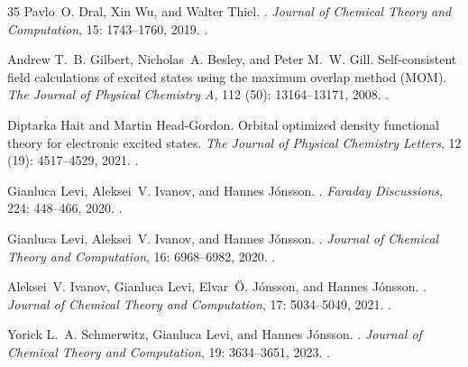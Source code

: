 \documentclass[11pt,a4paper]{article}
\begin{document}
\begin{thebibliography}{35}
Pavlo~O. Dral, Xin Wu, and Walter Thiel.
.
\newblock \emph{Journal of Chemical Theory and Computation}, 15:
  1743--1760, 2019.
\newblock {}.

Andrew T.~B. Gilbert, Nicholas~A. Besley, and Peter M.~W. Gill.
\newblock Self-consistent field calculations of excited states using the
  maximum overlap method ({MOM}).
\newblock \emph{The Journal of Physical Chemistry A}, 112
  (50): 13164--13171, 2008.
\newblock {}.

Diptarka Hait and Martin Head-Gordon.
\newblock Orbital optimized density functional theory for electronic excited
  states.
\newblock \emph{The Journal of Physical Chemistry Letters}, 12
  (19): 4517--4529, 2021.
\newblock {}.

Gianluca Levi, Aleksei~V. Ivanov, and Hannes J{\'o}nsson.
.
\newblock \emph{Faraday Discussions}, 224: 448--466,
  2020{}.
\newblock {}.

Gianluca Levi, Aleksei~V. Ivanov, and Hannes J{\'o}nsson.
.
\newblock \emph{Journal of Chemical Theory and Computation}, 16:
  6968--6982, 2020{}.
\newblock {}.

Aleksei~V. Ivanov, Gianluca Levi, Elvar~{\"O}. J{\'o}nsson, and Hannes
  J{\'o}nsson.
.
\newblock \emph{Journal of Chemical Theory and Computation}, 17:
  5034--5049, 2021.
\newblock {}.

Yorick L.~A. Schmerwitz, Gianluca Levi, and Hannes J{\'o}nsson.
.
\newblock \emph{Journal of Chemical Theory and Computation}, 19:
  3634--3651, 2023.
\newblock {}.


\end{thebibliography}
\end{document}
